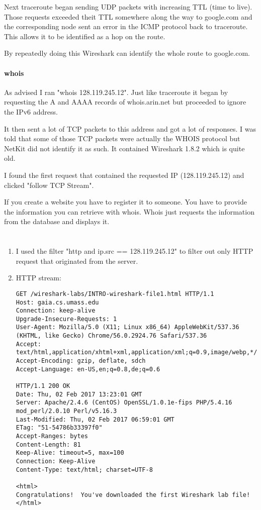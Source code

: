 \documentclass[12pt, a4paper]{article}
\begin{document}
\begin{enumerate}[a]
	Next traceroute began sending UDP packets with increasing TTL (time to live). Those requests exceeded theit TTL somewhere along the way to google.com and the corresponding node sent an error in the ICMP protocol back to traceroute. This allows it to be identified as a hop on the route.

	By repeatedly doing this Wireshark can identify the whole route to google.com.

	\paragraph{whois}
	As advised I ran "whois 128.119.245.12". Just like traceroute it began by requesting the A and AAAA records of whois.arin.net but proceeded to ignore the IPv6 address.

	It then sent a lot of TCP packets to this address and got a lot of responses. I was told that some of those TCP packets were actually the WHOIS protocol but NetKit did not identify it as such. It contained Wireshark 1.8.2 which is quite old.

	I found the first request that contained the requested IP (128.119.245.12) and clicked "follow TCP Stream".

	If you create a website you have to register it to someone. You have to provide the information you can retrieve with whois. Whois just requests the information from the database and displays it.
\end{enumerate}

\section{} %
\begin{enumerate}[a]
	\item %
	I used the filter "http and ip.src == 128.119.245.12" to filter out only HTTP request that originated from the server.

	\item %
	HTTP stream:

	\begin{lstlisting}
GET /wireshark-labs/INTRO-wireshark-file1.html HTTP/1.1
Host: gaia.cs.umass.edu
Connection: keep-alive
Upgrade-Insecure-Requests: 1
User-Agent: Mozilla/5.0 (X11; Linux x86_64) AppleWebKit/537.36 (KHTML, like Gecko) Chrome/56.0.2924.76 Safari/537.36
Accept: text/html,application/xhtml+xml,application/xml;q=0.9,image/webp,*/*;q=0.8
Accept-Encoding: gzip, deflate, sdch
Accept-Language: en-US,en;q=0.8,de;q=0.6

HTTP/1.1 200 OK
Date: Thu, 02 Feb 2017 13:23:01 GMT
Server: Apache/2.4.6 (CentOS) OpenSSL/1.0.1e-fips PHP/5.4.16 mod_perl/2.0.10 Perl/v5.16.3
Last-Modified: Thu, 02 Feb 2017 06:59:01 GMT
ETag: "51-54786b33397f0"
Accept-Ranges: bytes
Content-Length: 81
Keep-Alive: timeout=5, max=100
Connection: Keep-Alive
Content-Type: text/html; charset=UTF-8

<html>
Congratulations!  You've downloaded the first Wireshark lab file!
</html>
	\end{lstlisting}
\end{enumerate}
\end{document}

